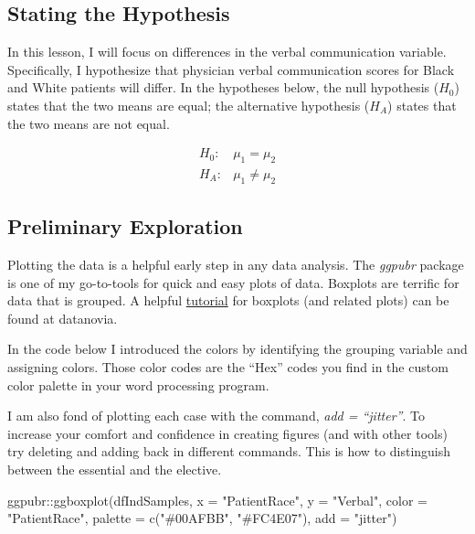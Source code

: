 \documentclass[
  11pt,
]{book}
\newenvironment{Shaded}{\begin{snugshade}}{\end{snugshade}}
\newcommand{\AttributeTok}[1]{\textcolor[rgb]{0.77,0.63,0.00}{#1}}
\newcommand{\FunctionTok}[1]{\textcolor[rgb]{0.00,0.00,0.00}{#1}}
\newcommand{\NormalTok}[1]{#1}
\newcommand{\SpecialCharTok}[1]{\textcolor[rgb]{0.00,0.00,0.00}{#1}}
\newcommand{\StringTok}[1]{\textcolor[rgb]{0.31,0.60,0.02}{#1}}
\begin{document}
\hypertarget{stating-the-hypothesis-1}{%
\subsection{Stating the Hypothesis}\label{stating-the-hypothesis-1}}

In this lesson, I will focus on differences in the verbal communication variable. Specifically, I hypothesize that physician verbal communication scores for Black and White patients will differ. In the hypotheses below, the null hypothesis (\(H_0\)) states that the two means are equal; the alternative hypothesis (\(H_A\)) states that the two means are not equal.

\[
\begin{array}{ll}
H_0: & \mu_1 = \mu_2  \\
H_A: & \mu_1 \neq \mu_2
\end{array}
\]

\hypertarget{preliminary-exploration-1}{%
\subsection{Preliminary Exploration}\label{preliminary-exploration-1}}

Plotting the data is a helpful early step in any data analysis. The \emph{ggpubr} package is one of my go-to-tools for quick and easy plots of data. Boxplots are terrific for data that is grouped. A helpful \href{https://rpkgs.datanovia.com/ggpubr/}{tutorial} for boxplots (and related plots) can be found at datanovia.

In the code below I introduced the colors by identifying the grouping variable and assigning colors. Those color codes are the ``Hex'' codes you find in the custom color palette in your word processing program.

I am also fond of plotting each case with the command, \emph{add = ``jitter''}. To increase your comfort and confidence in creating figures (and with other tools) try deleting and adding back in different commands. This is how to distinguish between the essential and the elective.

\begin{Shaded}
\begin{Highlighting}[]
\NormalTok{ggpubr}\SpecialCharTok{::}\FunctionTok{ggboxplot}\NormalTok{(dfIndSamples, }\AttributeTok{x =} \StringTok{"PatientRace"}\NormalTok{, }\AttributeTok{y =} \StringTok{"Verbal"}\NormalTok{, }\AttributeTok{color =} \StringTok{"PatientRace"}\NormalTok{,}
    \AttributeTok{palette =} \FunctionTok{c}\NormalTok{(}\StringTok{"\#00AFBB"}\NormalTok{, }\StringTok{"\#FC4E07"}\NormalTok{), }\AttributeTok{add =} \StringTok{"jitter"}\NormalTok{)}
\end{Highlighting}
\end{Shaded}
\end{document}
